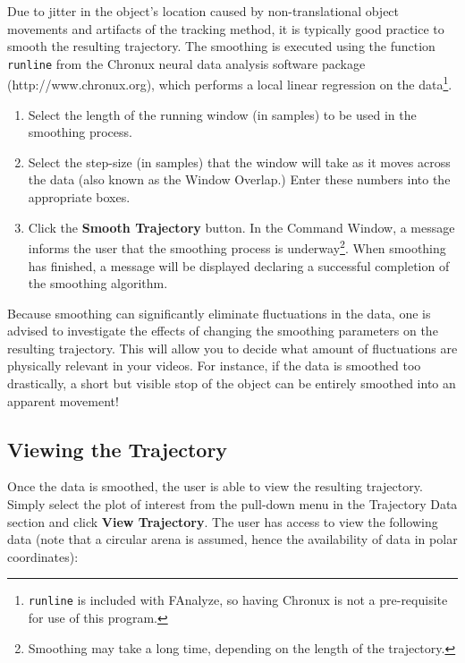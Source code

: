 \documentclass[letterpaper, 11pt]{article}
\begin{document}
Due to jitter in the object's location caused by non-translational object movements and artifacts
of the tracking method, it is typically good practice to smooth the resulting trajectory. The
smoothing is executed using the function \texttt{runline} from the Chronux neural data analysis
software package (http://www.chronux.org), which performs a local linear regression on the
data\footnote{\texttt{runline} is included with FAnalyze, so having Chronux is not a pre-requisite
for use of this program.}.

\begin{enumerate}
 \item Select the length of the running window (in samples) to be used in the smoothing process.
 \item Select the step-size (in samples) that the window will take as it moves across the data (also
 known as the Window Overlap.)  Enter these numbers into the appropriate boxes.
 \item Click the \textbf{Smooth Trajectory} button.  In the Command Window, a message informs the user that the smoothing process is underway\footnote{Smoothing may take a long time, depending on the length of the trajectory.}.  When smoothing has finished, a message
 will be displayed declaring a successful completion of the smoothing algorithm.
\end{enumerate}
Because smoothing can significantly eliminate fluctuations in the data, one is advised to
investigate the effects of changing the smoothing parameters on the resulting trajectory.  This
will allow you to decide what amount of fluctuations are physically relevant in your videos. For
instance, if the data is smoothed too drastically, a short but visible stop of the object can be
entirely smoothed into an apparent movement!

\subsection*{Viewing the Trajectory}

Once the data is smoothed, the user is able to view the resulting trajectory.  Simply select the
plot of interest from the pull-down menu in the Trajectory Data section and click \textbf{View
Trajectory}. The user has access to view the following data (note that a circular arena is assumed,
hence the availability of data in polar coordinates):
\end{document}
